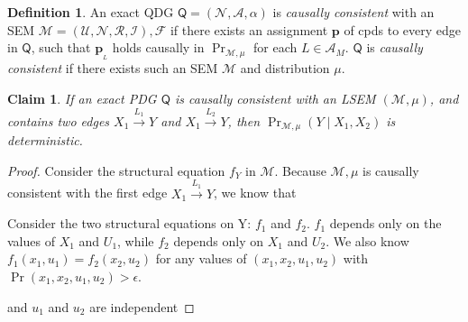 \documentclass{article}
\newcommand{\bp}[1][L]{\mathbf{p}_{\!_#1\!}}
\newcommand{\N}{\mathcal N}
\newcommand{\Ed}{\mathcal A}
\newcommand{\dg}[1]{\mathsf #1}
\newcommand\mat[1]{\mathbf #1}
\theoremstyle{plain}
\newtheorem{claim}[theorem]{Claim}
\theoremstyle{definition}
\newtheorem{defn}{Definition}
\theoremstyle{remark}
\begin{document}

\begin{defn}
	An exact QDG $\dg Q = (\N,\Ed,\alpha)$ is \emph{causally consistent} with an SEM $\mathcal M = (\mathcal U, \N, \mathcal R, \mathcal I), \mathcal F$
	if there exists an assignment $\mat p$ of cpds to every edge in $\dg Q$, such that  $\bp$ holds causally in $\Pr_{\mathcal M, \mu}$ for each $L \in \Ed_M$.
	$\dg Q$ is \emph{causally consistent} if there exists such an SEM $\mathcal M$ and distribution $\mu$.
\end{defn}



\begin{claim}
	If an exact PDG $\dg Q$ is causally consistent with an LSEM $(\mathcal M, \mu)$, and contains two edges $X_1 \overset{L_1}\longrightarrow Y$ and $X_1 \overset{L_2}\longrightarrow Y$, then $\Pr_{\mathcal M, \mu}(Y \mid X_1, X_2)$ is deterministic.
\end{claim}
\begin{proof}
	Consider the structural equation $f_Y$ in $\mathcal M$.
	Because $\mathcal M, \mu$ is causally consistent with the first edge $X_1 \overset{L_1}\longrightarrow Y$, 
	we know that 
	
	Consider the two structural equations on Y: $f_1$ and $f_2$. $f_1$ depends only on the values of $X_1$ and $U_1$, while $f_2$ depends only on $X_1$ and $U_2$. We also know $f_1(x_1, u_1) = f_2(x_2, u_2)$ for any values of $(x_1, x_2, u_1, u_2)$ with $\Pr(x_1, x_2, u_1, u_2) > \epsilon$.
	
	
	and $u_1$ and $u_2$ are independent 
\end{proof}
\end{document}
